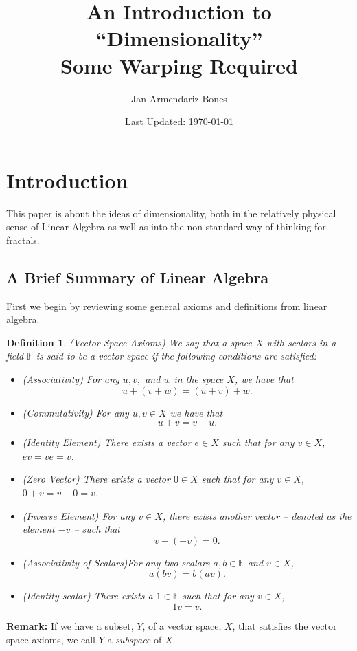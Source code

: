 \documentclass{article}
\title{An Introduction to ``Dimensionality''\\Some Warping Required}
\author{Jan Armendariz-Bones}
\date{Last Updated: \today}
\newtheorem{definition}{Definition}
\begin{document}
\maketitle
\section{Introduction}
This paper is about the ideas of dimensionality, both in the relatively physical sense of Linear Algebra as well as into the non-standard way of thinking for fractals.
\subsection{A Brief Summary of Linear Algebra}
First we begin by reviewing some general axioms and definitions from linear algebra.

\begin{definition} (Vector Space Axioms)
		We say that a space $X$ with scalars in a field $\mathbb{F}$ is said to be a vector space if the following conditions are satisfied:
		\begin{itemize}
				\item (Associativity) For any $u,v,$ and $w$ in the space $X$, we have that \[u+(v+w)=(u+v)+w.\]
				\item (Commutativity) For any $u,v\in X$ we have that \[u+v=v+u.\]
				\item (Identity Element) There exists a vector $e\in X$ such that for any $v\in X$, $ev=ve=v$.
				\item (Zero Vector) There exists a vector $0\in X$ such that for any $v\in X$, $0+v=v+0=v$.   
				\item (Inverse Element) For any $v\in X$, there exists another vector -- denoted as the element $-v$ -- such that
						\[
								v+(-v)=0.
						\]
				\item (Associativity of Scalars)For any two scalars $a,b\in\mathbb{F}$ and $v\in X$,
						\[
								a(bv) = b(av).
						\]
		\item (Identity scalar) There exists a $1\in\mathbb{F}$ such that for any $v\in X$, \[1v=v.\] 
		\end{itemize}	
\end{definition}	
\noindent\textbf{Remark:} If we have a subset, $Y$,  of a vector space, $X$,  that satisfies the vector space axioms, we call $Y$ a \emph{subspace} of $X$. 
\end{document}
